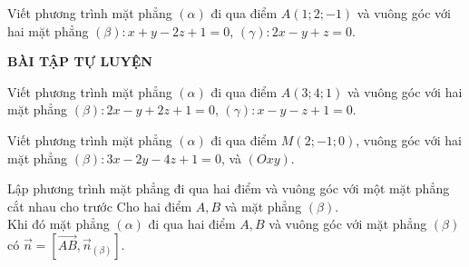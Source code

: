 \begin{vd}%
 Viết phương trình mặt phẳng $(\alpha)$ đi qua điểm $A\left(1;2;-1\right)$ và vuông góc với hai mặt phẳng $(\beta): x+y-2z+1=0$, $(\gamma): 2x-y+z=0$.
\end{vd}

\begin{center}
    \textbf{BÀI TẬP TỰ LUYỆN}
\end{center}
\begin{bt}%
Viết phương trình mặt phẳng $(\alpha)$ đi qua điểm $A\left(3;4;1\right)$ và vuông góc với hai mặt phẳng $(\beta): 2x-y+2z+1=0$, $(\gamma): x-y-z+1=0$.
\end{bt}

\begin{bt}%
    Viết phương trình mặt phẳng $(\alpha)$ đi qua điểm $M\left(2;-1;0\right)$, vuông góc với hai mặt phẳng $(\beta): 3x-2y-4z+1=0$, và $(Oxy)$.
\end{bt}

\begin{dang}{Lập phương trình mặt phẳng đi qua hai điểm và vuông góc với một mặt phẳng cắt nhau cho trước}
    Cho hai điểm $A,B$ và mặt phẳng $(\beta)$.\\
    Khi đó mặt phẳng $(\alpha)$ đi qua hai điểm $A,B$ và vuông góc với mặt phẳng $(\beta)$ có $\overrightarrow{n}=\left[\overrightarrow{AB},\overrightarrow{n}_{(\beta)}\right]$.
\end{dang}

